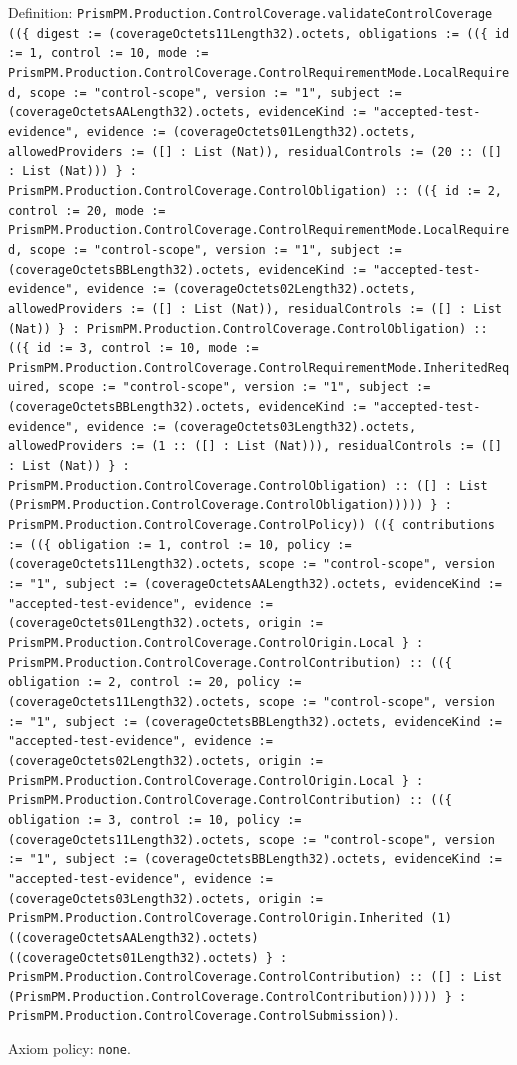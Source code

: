\documentclass[11pt]{article}
\begin{document}
\noindent Definition: \texttt{PrismPM.Production.ControlCoverage.validateControlCoverage ((\{ digest := (coverageOctets11Length32).octets, obligations := ((\{ id := 1, control := 10, mode := PrismPM.Production.ControlCoverage.ControlRequirementMode.LocalRequired, scope := "control-scope", version := "1", subject := (coverageOctetsAALength32).octets, evidenceKind := "accepted-test-evidence", evidence := (coverageOctets01Length32).octets, allowedProviders := ([] : List (Nat)), residualControls := (20 :: ([] : List (Nat))) \} : PrismPM.Production.ControlCoverage.ControlObligation) :: ((\{ id := 2, control := 20, mode := PrismPM.Production.ControlCoverage.ControlRequirementMode.LocalRequired, scope := "control-scope", version := "1", subject := (coverageOctetsBBLength32).octets, evidenceKind := "accepted-test-evidence", evidence := (coverageOctets02Length32).octets, allowedProviders := ([] : List (Nat)), residualControls := ([] : List (Nat)) \} : PrismPM.Production.ControlCoverage.ControlObligation) :: ((\{ id := 3, control := 10, mode := PrismPM.Production.ControlCoverage.ControlRequirementMode.InheritedRequired, scope := "control-scope", version := "1", subject := (coverageOctetsBBLength32).octets, evidenceKind := "accepted-test-evidence", evidence := (coverageOctets03Length32).octets, allowedProviders := (1 :: ([] : List (Nat))), residualControls := ([] : List (Nat)) \} : PrismPM.Production.ControlCoverage.ControlObligation) :: ([] : List (PrismPM.Production.ControlCoverage.ControlObligation))))) \} : PrismPM.Production.ControlCoverage.ControlPolicy)) ((\{ contributions := ((\{ obligation := 1, control := 10, policy := (coverageOctets11Length32).octets, scope := "control-scope", version := "1", subject := (coverageOctetsAALength32).octets, evidenceKind := "accepted-test-evidence", evidence := (coverageOctets01Length32).octets, origin := PrismPM.Production.ControlCoverage.ControlOrigin.Local \} : PrismPM.Production.ControlCoverage.ControlContribution) :: ((\{ obligation := 2, control := 20, policy := (coverageOctets11Length32).octets, scope := "control-scope", version := "1", subject := (coverageOctetsBBLength32).octets, evidenceKind := "accepted-test-evidence", evidence := (coverageOctets02Length32).octets, origin := PrismPM.Production.ControlCoverage.ControlOrigin.Local \} : PrismPM.Production.ControlCoverage.ControlContribution) :: ((\{ obligation := 3, control := 10, policy := (coverageOctets11Length32).octets, scope := "control-scope", version := "1", subject := (coverageOctetsBBLength32).octets, evidenceKind := "accepted-test-evidence", evidence := (coverageOctets03Length32).octets, origin := PrismPM.Production.ControlCoverage.ControlOrigin.Inherited (1) ((coverageOctetsAALength32).octets) ((coverageOctets01Length32).octets) \} : PrismPM.Production.ControlCoverage.ControlContribution) :: ([] : List (PrismPM.Production.ControlCoverage.ControlContribution))))) \} : PrismPM.Production.ControlCoverage.ControlSubmission))}.\par
\noindent Axiom policy: \texttt{none}.\par
\end{document}

